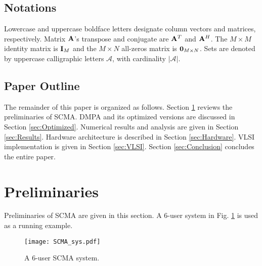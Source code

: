 \documentclass[journal,twoside]{IEEEtran}
\begin{document}

\subsection{Notations}
Lowercase and uppercase boldface letters designate column vectors and matrices, respectively. Matrix $\bf{A}$'s transpose and conjugate are ${\bf{A}}^{T}$ and ${\bf{A}}^{H}$. The $M \times M$ identity matrix is ${\bf{I}}_{M}$ and the $M \times N$ all-zeros matrix is ${\bf{0}}_{M \times N}$. Sets are denoted by uppercase calligraphic letters $\mathcal{A}$, with cardinality $|\mathcal{A}|$.

\subsection{Paper Outline}
The remainder of this paper is organized as follows. Section \ref{sec:Preliminaries} reviews the preliminaries of SCMA. DMPA and its optimized versions are discussed in Section \ref{sec:Optimized}. Numerical results and analysis are given in Section \ref{sec:Results}. Hardware architecture is described in Section \ref{sec:Hardware}. VLSI implementation is given in Section \ref{sec:VLSI}. Section \ref{sec:Conclusion} concludes the entire paper.

\section{Preliminaries}\label{sec:Preliminaries}
Preliminaries of SCMA are given in this section. A $6$-user system in Fig. \ref{fig:SCMA_sys} is used as a running example.
\begin{figure}[htbp]
\centering
\texttt{[image: SCMA\_sys.pdf]}
\caption{\label{fig:SCMA_sys}A $6$-user SCMA system.}
\end{figure}
\end{document}
